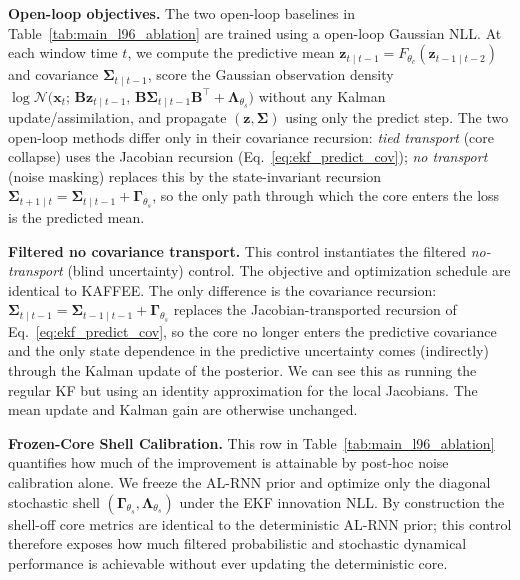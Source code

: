 \documentclass{article}
\theoremstyle{plain}
\theoremstyle{definition}
\theoremstyle{remark}
\begin{document}
\textbf{Open-loop objectives.}
The two open-loop baselines in Table~\ref{tab:main_l96_ablation} are trained using a open-loop Gaussian NLL. At each window time $t$, we compute the predictive mean $\bm z_{t\mid t-1}=F_{\theta_c}(\bm z_{t-1\mid t-2})$ and
covariance $\bm\Sigma_{t\mid t-1}$, score the Gaussian
observation density $\log\mathcal{N} \big(\bm x_t;\,\bm B\bm z_{t\mid t-1},\,
\bm B\bm\Sigma_{t\mid t-1}\bm B^\top+\bm\Lambda_{\theta_s}\big)$
without any Kalman update/assimilation, and propagate $(\bm z,\bm\Sigma)$ using only the predict step. The two open-loop methods differ only in their covariance recursion: \emph{tied transport} (core collapse) uses the Jacobian recursion (Eq.~\ref{eq:ekf_predict_cov}); \emph{no
transport} (noise masking)
replaces this by the state-invariant recursion
$\bm\Sigma_{t+1\mid t}=\bm\Sigma_{t\mid t-1}+\bm\Gamma_{\theta_s}$,
so the only path through which the core enters the loss is the predicted mean.

\textbf{Filtered no covariance transport.}
This control instantiates the filtered \emph{no-transport} (blind uncertainty) control. The objective and optimization schedule are identical to KAFFEE. The only difference is the covariance recursion: $\bm\Sigma_{t\mid t-1}=\bm\Sigma_{t-1\mid t-1}+\bm\Gamma_{\theta_s}$ replaces the Jacobian-transported recursion of Eq.~\ref{eq:ekf_predict_cov}, so the core no longer enters the predictive covariance and the only state dependence in the predictive uncertainty comes (indirectly) through the Kalman update of the posterior. We can see this as running the regular KF but using an identity approximation for the local Jacobians. The mean update and Kalman gain are otherwise unchanged.

\textbf{Frozen-Core Shell Calibration.}
This row in Table~\ref{tab:main_l96_ablation} quantifies how much of the improvement is attainable by post-hoc noise calibration alone. We freeze the AL-RNN prior and optimize only the diagonal stochastic shell $(\bm \Gamma_{\theta_s},\bm \Lambda_{\theta_s})$ under the EKF innovation NLL. By construction the shell-off core metrics are identical to the deterministic AL-RNN prior; this control therefore exposes how much filtered probabilistic and stochastic dynamical performance is achievable without ever updating the deterministic core.
\end{document}
